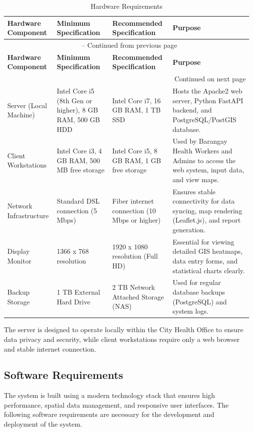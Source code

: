 \documentclass[12pt, a4paper]{report}
\begin{document}
\vspace{0.3cm}
\begin{longtable}{p{3cm} p{4cm} p{4cm} p{3cm}}
    \caption{Hardware Requirements} \label{tab:hardware} \\
    \toprule
    \textbf{Hardware Component} & \textbf{Minimum Specification} & \textbf{Recommended Specification} & \textbf{Purpose} \\
    \midrule
    \endfirsthead
    \multicolumn{4}{c}{{\tablename\ \thetable{} -- Continued from previous page}} \\
    \toprule
    \textbf{Hardware Component} & \textbf{Minimum Specification} & \textbf{Recommended Specification} & \textbf{Purpose} \\
    \midrule
    \endhead
    \midrule
    \multicolumn{4}{r}{{Continued on next page}} \\
    \endfoot
    \bottomrule
    \endlastfoot
    Server (Local Machine) & Intel Core i5 (8th Gen or higher), 8 GB RAM, 500 GB HDD & Intel Core i7, 16 GB RAM, 1 TB SSD & Hosts the Apache2 web server, Python FastAPI backend, and PostgreSQL/PostGIS database. \\
    \addlinespace
    Client Workstations & Intel Core i3, 4 GB RAM, 500 MB free storage & Intel Core i5, 8 GB RAM, 1 GB free storage & Used by Barangay Health Workers and Admins to access the web system, input data, and view maps. \\
    \addlinespace
    Network Infrastructure & Standard DSL connection (5 Mbps) & Fiber internet connection (10 Mbps or higher) & Ensures stable connectivity for data syncing, map rendering (Leaflet.js), and report generation. \\
    \addlinespace
    Display Monitor & 1366 x 768 resolution & 1920 x 1080 resolution (Full HD) & Essential for viewing detailed GIS heatmaps, data entry forms, and statistical charts clearly. \\
    \addlinespace
    Backup Storage & 1 TB External Hard Drive & 2 TB Network Attached Storage (NAS) & Used for regular database backups (PostgreSQL) and system logs. \\
\end{longtable}
\vspace{0.3cm}

The server is designed to operate locally within the City Health Office to ensure data privacy and security, while client workstations require only a web browser and stable internet connection.

\subsection{Software Requirements}
\label{subsec:software}
The system is built using a modern technology stack that ensures high performance, spatial data management, and responsive user interfaces. The following software requirements are necessary for the development and deployment of the system.
\end{document}
